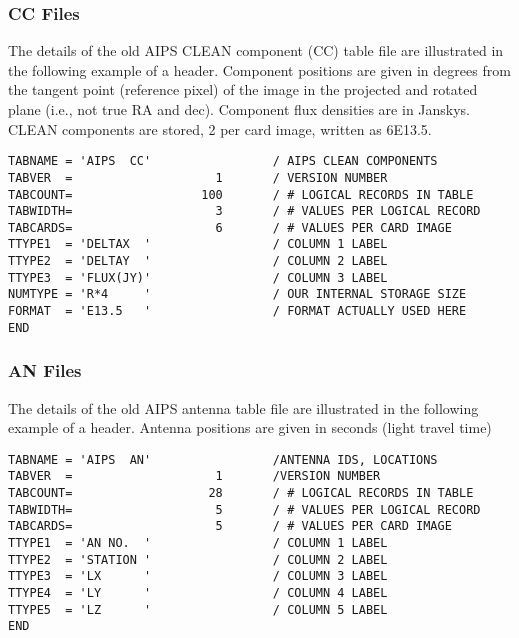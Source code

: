 \subsubsection{CC Files }
The details of the old AIPS CLEAN component (CC) table file are
illustrated in the following example of a header.  Component positions
are given in degrees from the tangent point (reference pixel) of the
image in the projected and rotated plane (i.e., not true RA and dec).
Component flux densities are in Janskys.  CLEAN components are stored,
2 per card image, written as 6E13.5.

\begin{verbatim}
TABNAME = 'AIPS  CC'                 / AIPS CLEAN COMPONENTS
TABVER  =                    1       / VERSION NUMBER
TABCOUNT=                  100       / # LOGICAL RECORDS IN TABLE
TABWIDTH=                    3       / # VALUES PER LOGICAL RECORD
TABCARDS=                    6       / # VALUES PER CARD IMAGE
TTYPE1  = 'DELTAX  '                 / COLUMN 1 LABEL
TTYPE2  = 'DELTAY  '                 / COLUMN 2 LABEL
TTYPE3  = 'FLUX(JY)'                 / COLUMN 3 LABEL
NUMTYPE = 'R*4     '                 / OUR INTERNAL STORAGE SIZE
FORMAT  = 'E13.5   '                 / FORMAT ACTUALLY USED HERE
END

\end{verbatim}
\subsubsection{AN Files }
The details of the old AIPS antenna table file are illustrated in the
following example of a header.  Antenna positions are given in seconds
(light travel time)

\begin{verbatim}
TABNAME = 'AIPS  AN'                 /ANTENNA IDS, LOCATIONS
TABVER  =                    1       /VERSION NUMBER
TABCOUNT=                   28       / # LOGICAL RECORDS IN TABLE
TABWIDTH=                    5       / # VALUES PER LOGICAL RECORD
TABCARDS=                    5       / # VALUES PER CARD IMAGE
TTYPE1  = 'AN NO.  '                 / COLUMN 1 LABEL
TTYPE2  = 'STATION '                 / COLUMN 2 LABEL
TTYPE3  = 'LX      '                 / COLUMN 3 LABEL
TTYPE4  = 'LY      '                 / COLUMN 4 LABEL
TTYPE5  = 'LZ      '                 / COLUMN 5 LABEL
END

\end{verbatim}

